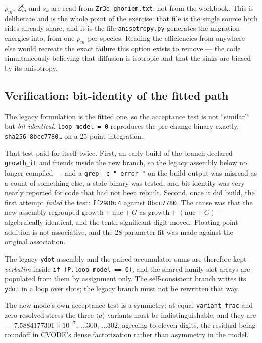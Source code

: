 \documentclass[11pt,a4paper]{article}
\newcommand{\code}[1]{\texttt{\small #1}}
\newcommand{\aloop}{\ensuremath{\langle a\rangle}}
\begin{document}
$p_m$, $Z^0_m$ and $s_k$ are read from \code{Zr3d\_ghoniem.txt}, not from the
workbook. This is deliberate and is the whole point of the exercise: that file
is the single source both sides already share, and it is the file
\code{anisotropy.py} generates the migration energies into, from one $p_m$ per
species. Reading the efficiencies from anywhere else would recreate the exact
failure this option exists to remove --- the code simultaneously believing that
diffusion is isotropic and that the sinks are biased by its anisotropy.

\subsection{Verification: bit-identity of the fitted path}

The legacy formulation is the fitted one, so the acceptance test is not
``similar'' but \emph{bit-identical}. \code{loop\_model = 0} reproduces the
pre-change binary exactly, \code{sha256 8bcc7780\ldots} on a 25-point
integration.

That test paid for itself twice. First, an early build of the branch declared
\code{growth\_iL} and friends inside the new branch, so the legacy assembly
below no longer compiled --- and a \code{grep -c " error "} on the build output
was misread as a count of something else, a stale binary was tested, and
bit-identity was very nearly reported for code that had not been rebuilt.
Second, once it did build, the first attempt \emph{failed} the test:
\code{ff2980c4} against \code{8bcc7780}. The cause was that the new assembly
regrouped $\text{growth} + \text{nuc} + G$ as
$\text{growth} + (\text{nuc} + G)$ --- algebraically identical, and the tenth
significant digit moved. Floating-point addition is not associative, and the
28-parameter fit was made against the original association.

The legacy \code{ydot} assembly and the paired accumulator sums are therefore
kept \emph{verbatim} inside \code{if (P.loop\_model == 0)}, and the shared
family-slot arrays are populated from them by assignment only. The
self-consistent branch writes its \code{ydot} in a loop over slots; the legacy
branch must not be rewritten that way.

The new mode's own acceptance test is a symmetry: at equal
\code{variant\_frac} and zero resolved stress the three \aloop{} variants must
be indistinguishable, and they are --- $7.5884177301\times10^{-7}$,
$\ldots300$, $\ldots302$, agreeing to eleven digits, the residual being
roundoff in CVODE's dense factorization rather than asymmetry in the model.
\end{document}

